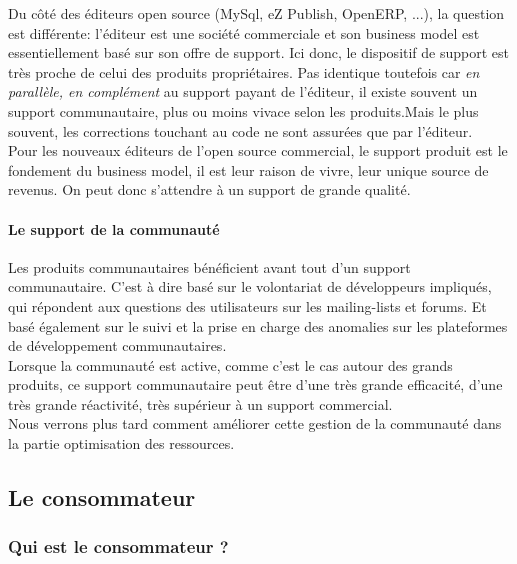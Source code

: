 				Du côté des éditeurs open source (MySql, eZ Publish, OpenERP, ...), la question est différente: l'éditeur est une société commerciale et son business model est essentiellement basé sur son offre de support. Ici donc, le dispositif de support est très proche de celui des produits propriétaires. Pas identique toutefois car \textit{en parallèle, en complément} au support payant de l'éditeur, il existe souvent un support communautaire, plus ou moins vivace selon les produits.Mais le plus souvent, les corrections touchant au code ne sont assurées que par l'éditeur.\\

				Pour les nouveaux éditeurs de l'open source commercial, le support produit est le fondement du business model, il est leur raison de vivre, leur unique source de revenus. On peut donc s'attendre à un support de grande qualité.

				\paragraph{Le support de la communauté\\}

				Les produits communautaires bénéficient avant tout d'un support communautaire. C'est à dire basé sur le volontariat de développeurs impliqués, qui répondent aux questions des utilisateurs sur les mailing-lists et forums. Et basé également sur le suivi et la prise en charge des anomalies sur les plateformes de développement communautaires.\\

				Lorsque la communauté est active, comme c'est le cas autour des grands produits, ce support communautaire peut être d'une très grande efficacité, d'une très grande réactivité, très supérieur à un support commercial.\\

				Nous verrons plus tard comment améliorer cette gestion de la communauté dans la partie optimisation des ressources.

		\subsection{Le consommateur}

			\subsubsection{Qui est le consommateur ?}

